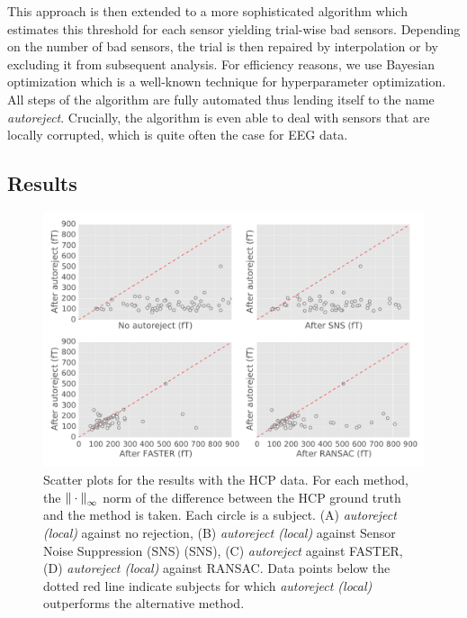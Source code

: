 This approach is then extended to a more sophisticated algorithm which estimates this threshold for each sensor yielding trial-wise bad sensors. Depending on the number of bad sensors, the trial is then repaired by interpolation or by excluding it from subsequent analysis. For efficiency reasons, we use Bayesian optimization which is a well-known technique for hyperparameter optimization. All steps of the algorithm are fully automated thus lending itself to the name \emph{autoreject}. Crucially, the algorithm is even able to deal with sensors that are locally corrupted, which is quite often the case for \ac{EEG} data.

\subsection*{Results}

\begin{figure}[htb]
    \centering
    \includegraphics[width=\linewidth]{figures/figure4.pdf}
    \caption[]{Scatter plots for the results with the HCP data. For each method, the ${\| \cdot \|}_{\mathrm{\infty}}$ norm of the difference between the HCP ground truth and the method is taken. Each circle is a subject. (A) \textit{autoreject (local)} against no rejection, (B) \textit{autoreject (local)} against Sensor Noise Suppression (SNS) (SNS), (C) \textit{autoreject} against FASTER, (D) \textit{autoreject (local)} against RANSAC. Data points below the dotted red line indicate subjects for which \textit{autoreject (local)} outperforms the alternative method.}
    \label{fig:sommaire:hcp_scatter}
\end{figure}

